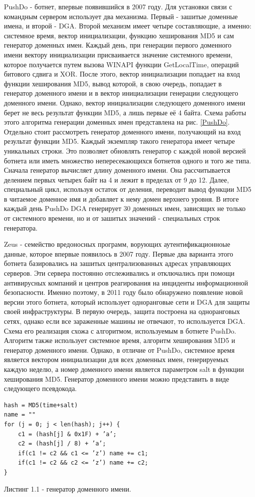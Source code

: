 PushDo - ботнет, впервые появившийся в 2007 году. Для установки связи с командным сервером использует два механизма. Первый - зашитые доменные имена, и второй - DGA. Второй механизм имеет четыре составляющие, а именно: системное время, вектор инициализации, функцию хеширования MD5 и сам генератор доменных имен. Каждый день, при генерации первого доменного имени вектору инициализации присваивается значение системного времени, которое получается путем вызова WINAPI функции GetLocalTime, операций битового сдвига и XOR. После этого, вектор инициализации попадает на вход функции хеширования MD5, вывод которой, в свою очередь, попадает в генератор доменного имени и в вектор инициализации генерации следующего доменного имени. Однако, вектор инициализации следующего доменного имени берет не весь результат функции MD5, а лишь первые её 4 байта. Схема работы этого алгоритма генерации доменных имен представлена на рис. \ref{PushDo}.
Отдельно стоит рассмотреть генератор доменного имени, получающий на вход результат функции MD5. Каждый экземпляр такого генератора имеет четыре уникальных строки. Это позволяет обновлять генератор с каждой новой версией ботнета или иметь множество непересекающихся ботнетов одного и того же типа. Сначала генератор вычисляет длину доменного имени. Она рассчитывается делением первых четырех байт на 4 и лежит в пределах от 9 до 12. Далее, специальный цикл, используя остаток от деления, переводит вывод функции MD5 в читаемое доменное имя и добавляет к нему домен верхнего уровня. В итоге каждый день PushDo DGA генерирует 30 доменных имен, зависящих не только от системного времени, но и от зашитых значений - специальных строк генератора.

Zeus - семейство вредоносных программ, ворующих аутентификационноые данные, которое впервые появилось в 2007 году. Первые два варианта этого ботнета базировались на зашитых централизованных адресах управляющих серверов. Эти сервера постоянно отслеживались и отключались при помощи антивирусных компаний и центров реагирования на инциденты информационной безопасности. Именно поэтому, в 2011 году было обнаружено появление новой версии этого ботнета, который использует одноранговые сети и DGA для защиты своей инфраструктуры. В первую очередь, защита построена на одноранговых сетях, однако если все зараженные машины не отвечают, то используется DGA. Схема его реализация схожа с алгоритмом, используемым в ботнете PushDo. Алгоритм также использует системное время, алгоритм хеширования MD5 и генератор доменного имени. Однако, в отличие от PushDo, системное время является вектором инициализации для всех доменных имен, генерируемых каждую неделю, а номер доменного имени является параметром salt в функции хеширования MD5. Генератор доменного имени можно представить в виде следующего псевдокода.
\begin{lstlisting}
hash = MD5(time+salt)
name = ""
for (j = 0; j < len(hash); j++) {
    c1 = (hash[j] & 0x1F) + ’a’;
    c2 = (hash[j] / 8) + ’a’;
    if(c1 != c2 && c1 <= ’z’) name += c1;
    if(c1 != c2 && c2 <= ’z’) name += c2;
}
\end{lstlisting}
Листинг 1.1 - генератор доменного имени.

